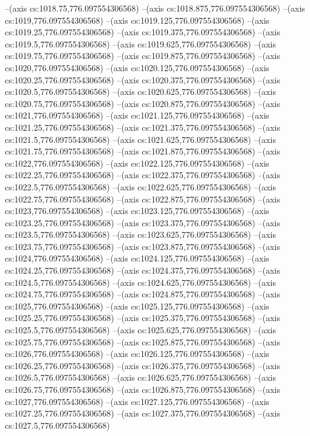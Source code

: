 --(axis cs:1018.75,776.097554306568)
--(axis cs:1018.875,776.097554306568)
--(axis cs:1019,776.097554306568)
--(axis cs:1019.125,776.097554306568)
--(axis cs:1019.25,776.097554306568)
--(axis cs:1019.375,776.097554306568)
--(axis cs:1019.5,776.097554306568)
--(axis cs:1019.625,776.097554306568)
--(axis cs:1019.75,776.097554306568)
--(axis cs:1019.875,776.097554306568)
--(axis cs:1020,776.097554306568)
--(axis cs:1020.125,776.097554306568)
--(axis cs:1020.25,776.097554306568)
--(axis cs:1020.375,776.097554306568)
--(axis cs:1020.5,776.097554306568)
--(axis cs:1020.625,776.097554306568)
--(axis cs:1020.75,776.097554306568)
--(axis cs:1020.875,776.097554306568)
--(axis cs:1021,776.097554306568)
--(axis cs:1021.125,776.097554306568)
--(axis cs:1021.25,776.097554306568)
--(axis cs:1021.375,776.097554306568)
--(axis cs:1021.5,776.097554306568)
--(axis cs:1021.625,776.097554306568)
--(axis cs:1021.75,776.097554306568)
--(axis cs:1021.875,776.097554306568)
--(axis cs:1022,776.097554306568)
--(axis cs:1022.125,776.097554306568)
--(axis cs:1022.25,776.097554306568)
--(axis cs:1022.375,776.097554306568)
--(axis cs:1022.5,776.097554306568)
--(axis cs:1022.625,776.097554306568)
--(axis cs:1022.75,776.097554306568)
--(axis cs:1022.875,776.097554306568)
--(axis cs:1023,776.097554306568)
--(axis cs:1023.125,776.097554306568)
--(axis cs:1023.25,776.097554306568)
--(axis cs:1023.375,776.097554306568)
--(axis cs:1023.5,776.097554306568)
--(axis cs:1023.625,776.097554306568)
--(axis cs:1023.75,776.097554306568)
--(axis cs:1023.875,776.097554306568)
--(axis cs:1024,776.097554306568)
--(axis cs:1024.125,776.097554306568)
--(axis cs:1024.25,776.097554306568)
--(axis cs:1024.375,776.097554306568)
--(axis cs:1024.5,776.097554306568)
--(axis cs:1024.625,776.097554306568)
--(axis cs:1024.75,776.097554306568)
--(axis cs:1024.875,776.097554306568)
--(axis cs:1025,776.097554306568)
--(axis cs:1025.125,776.097554306568)
--(axis cs:1025.25,776.097554306568)
--(axis cs:1025.375,776.097554306568)
--(axis cs:1025.5,776.097554306568)
--(axis cs:1025.625,776.097554306568)
--(axis cs:1025.75,776.097554306568)
--(axis cs:1025.875,776.097554306568)
--(axis cs:1026,776.097554306568)
--(axis cs:1026.125,776.097554306568)
--(axis cs:1026.25,776.097554306568)
--(axis cs:1026.375,776.097554306568)
--(axis cs:1026.5,776.097554306568)
--(axis cs:1026.625,776.097554306568)
--(axis cs:1026.75,776.097554306568)
--(axis cs:1026.875,776.097554306568)
--(axis cs:1027,776.097554306568)
--(axis cs:1027.125,776.097554306568)
--(axis cs:1027.25,776.097554306568)
--(axis cs:1027.375,776.097554306568)
--(axis cs:1027.5,776.097554306568)
